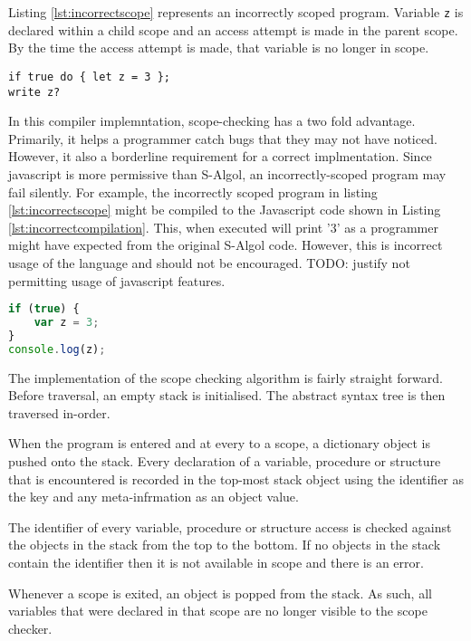 \documentclass{article}
\begin{document}
Listing \ref{lst:incorrectscope} represents an incorrectly scoped program. Variable \lstinline{z} is declared within a child scope and an access attempt is made in the parent scope. By the time the access attempt is made, that variable is no longer in scope. 

\begin{lstlisting}[caption={Incorrectly scoped program},label={lst:incorrectscope}, escapechar="|"]
if true do { let z = 3 };
write z?
\end{lstlisting}

In this compiler implemntation, scope-checking has a two fold advantage. Primarily, it helps a programmer catch bugs that they may not have noticed. However, it also a borderline requirement for a correct implmentation. Since javascript is more permissive than S-Algol, an incorrectly-scoped program may fail silently. For example, the incorrectly scoped program in listing \ref{lst:incorrectscope} might be compiled to the Javascript code shown in Listing \ref{lst:incorrectcompilation}. This, when executed will print '3' as a programmer might have expected from the original S-Algol code. However, this is incorrect usage of the language and should not be encouraged. TODO: justify not permitting usage of javascript features.

\begin{lstlisting}[caption={Possible compilation of Listing \ref{lst:incorrectscope}},label={lst:incorrectcompilation}, language=javascript]
if (true) {
	var z = 3;
}
console.log(z);
\end{lstlisting}

The implementation of the scope checking algorithm is fairly straight forward. Before traversal, an empty stack is initialised. The abstract syntax tree is then traversed in-order.

When the program is entered and at every to a scope, a dictionary object is pushed onto the stack. Every declaration of a variable, procedure or structure that is encountered is recorded in the top-most stack object using the identifier as the key and any meta-infrmation as an object value.

The identifier of every variable, procedure or structure access is checked against the objects in the stack from the top to the bottom. If no objects in the stack contain the identifier then it is not available in scope and there is an error.

Whenever a scope is exited, an object is popped from the stack. As such, all variables that were declared in that scope are no longer visible to the scope checker.
\end{document}
